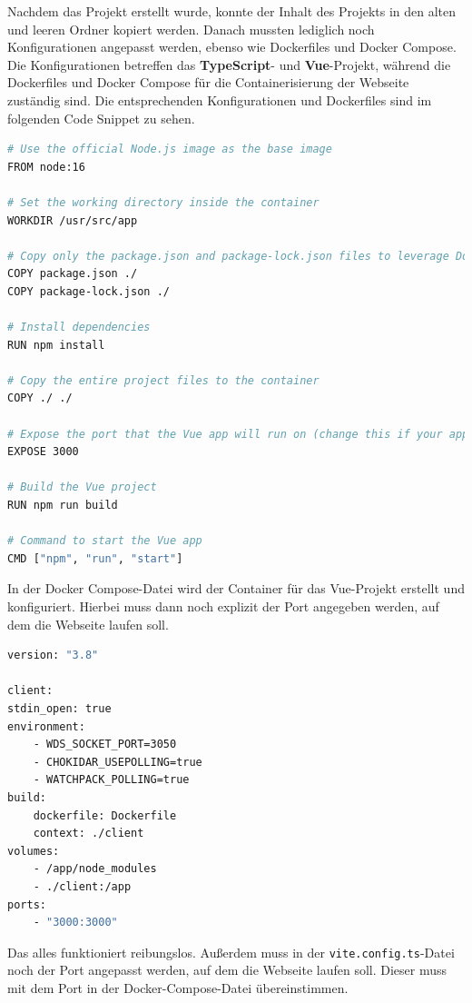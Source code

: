 Nachdem das Projekt erstellt wurde, konnte der Inhalt des Projekts in den alten und leeren Ordner kopiert werden. Danach mussten lediglich noch Konfigurationen angepasst werden, ebenso wie Dockerfiles und Docker Compose. Die Konfigurationen betreffen das \textbf{TypeScript}- und \textbf{Vue}-Projekt, während die Dockerfiles und Docker Compose für die Containerisierung der Webseite zuständig sind. Die entsprechenden Konfigurationen und Dockerfiles sind im folgenden Code Snippet zu sehen.

\begin{lstlisting}[language={bash}, caption={Dockerfile für das Vue Projekt}]
# Use the official Node.js image as the base image
FROM node:16

# Set the working directory inside the container
WORKDIR /usr/src/app

# Copy only the package.json and package-lock.json files to leverage Docker cache
COPY package.json ./
COPY package-lock.json ./

# Install dependencies
RUN npm install

# Copy the entire project files to the container
COPY ./ ./

# Expose the port that the Vue app will run on (change this if your app uses a different port)
EXPOSE 3000

# Build the Vue project
RUN npm run build

# Command to start the Vue app
CMD ["npm", "run", "start"]
\end{lstlisting}

In der Docker Compose-Datei wird der Container für das Vue-Projekt erstellt und konfiguriert. Hierbei muss dann noch explizit der Port angegeben werden, auf dem die Webseite laufen soll.

\begin{lstlisting}[language={bash}, caption={Docker Compose für das Vue Projekt}]
version: "3.8"

client:
stdin_open: true
environment:
    - WDS_SOCKET_PORT=3050
    - CHOKIDAR_USEPOLLING=true
    - WATCHPACK_POLLING=true
build:
    dockerfile: Dockerfile
    context: ./client
volumes:
    - /app/node_modules
    - ./client:/app
ports:
    - "3000:3000"
\end{lstlisting}

Das alles funktioniert reibungslos. Außerdem muss in der \texttt{vite.config.ts}-Datei noch der Port angepasst werden, auf dem die Webseite laufen soll. Dieser muss mit dem Port in der Docker-Compose-Datei übereinstimmen.

